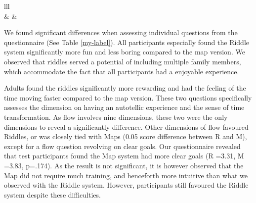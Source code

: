 \begin{table}[h]
\begin{tabular}{lll}
                                                                                                                                                                                                                                         \\ \hline
{}                                                                   &                   &                     \\ \hline
{}                                                                                                                                      
\end{tabular}
\end{table}

We found significant differences when assessing individual questions from the questionnaire (See Table \ref{my-label}). All participants especially found the Riddle system significantly more fun and less boring compared to the map version. We observed that riddles served a potential of including multiple family members, which  accommodate the fact that all participants had a enjoyable experience. 

Adults found the riddles significantly more rewarding and had the feeling of the time moving faster compared to the map version. These two questions specifically assesses the dimension on having an autotellic experience and the sense of time transformation. As flow involves nine dimensions, these two were the only dimensions to reveal a significantly difference. Other dimensions of flow favoured Riddles, or was closely tied with Maps (0.05 score difference between R and M), except for a flow question revolving on clear goals. Our questionnaire revealed that test participants found the Map system had more clear goals (R =3.31, M =3.83, p=.174). As the result is not significant, it is however observed that the Map did not require much training, and henceforth more intuitive than what we observed with the Riddle system. However, participants still favoured the Riddle system despite these difficulties. 

